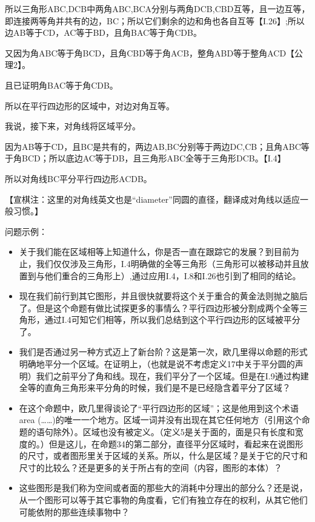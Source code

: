 \documentclass[
]{book}
\providecommand{\tightlist}{%
  \setlength{\itemsep}{0pt}\setlength{\parskip}{0pt}}
\begin{document}
所以三角形ABC,DCB中两角ABC,BCA分别与两角DCB,CBD互等，且一边互等，即连接两等角并共有的边，BC；所以它们剩余的边和角也各自互等【I.26】;所以边AB等于CD，AC等于BD，且角BAC等于角CDB。

又因为角ABC等于角BCD，且角CBD等于角ACB，整角ABD等于整角ACD【公理2】。

且已证明角BAC等于角CDB。

所以在平行四边形的区域中，对边对角互等。

我说，接下来，对角线将区域平分。

因为AB等于CD，且BC是共有的，两边AB,BC分别等于两边DC,CB；且角ABC等于角BCD；所以底边AC等于DB，且三角形ABC全等于三角形DCB。【I.4】

所以对角线BC平分平行四边形ACDB。

【宣棋注：这里的对角线英文也是``diameter''同圆的直径，翻译成对角线以适应一般习惯。】

问题示例：

\begin{itemize}
\tightlist
\item
  关于我们能在区域相等上知道什么，你是否一直在跟踪它的发展？到目前为止，我们仅仅涉及三角形，I.4明确做的全等三角形（三角形可以被移动并且放置到与他们重合的三角形上）,通过应用I.4，I.8和I.26也引到了相同的结论。
\item
  现在我们前行到其它图形，并且很快就要将这个关于重合的黄金法则抛之脑后了。但是这个命题有做比试探更多的事情么？平行四边形被分割成两个全等三角形，通过I.4可知它们相等，所以我们总结到这个平行四边形的区域被平分了。
\item
  我们是否通过另一种方式迈上了新台阶？这是第一次，欧几里得以命题的形式明确地平分一个区域。在证明上，（也就是说不考虑定义17中关于平分圆的声明）我们之前平分了角和线。现在，我们平分了一个区域。但是在I.9通过构建全等的直角三角形来平分角的时候，我们是不是已经隐含着平分了区域？
\item
  在这个命题中，欧几里得谈论了``平行四边形的区域''；这是他用到这个术语area (\ldots\ldots)的唯一一个地方。区域一词并没有出现在其它任何地方（引用这个命题的语句除外）。区域也没有被定义。（定义5是关于面的，面是只有长度和宽度的。）但是这儿，在命题34的第二部分，直径平分区域时，看起来在说图形的尺寸，或者图形里关于区域的关系。所以，什么是区域？是关于它的尺寸和尺寸的比较么？还是更多的关于所占有的空间（内容，图形的本体）？
\item
  这些图形是我们称为空间或者面的那些大的消耗中分理出的部分么？还是说，从一个图形可以等于其它事物的角度看，它们有独立存在的权利，从其它他们可能依附的那些连续事物中？
\end{itemize}
\end{document}
